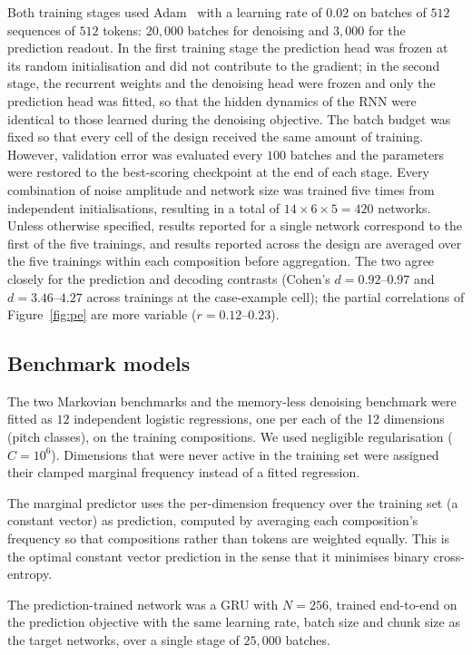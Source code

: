     Both training stages used Adam~\cite{kingma2015adam} with a learning rate of $0.02$ on batches of $512$ sequences of $512$ tokens: $20{,}000$ batches for denoising and $3{,}000$ for the prediction readout. In the first training stage the prediction head was frozen at its random initialisation and did not contribute to the gradient; in the second stage, the recurrent weights and the denoising head were frozen and only the prediction head was fitted, so that the hidden dynamics of the RNN were identical to those learned during the denoising objective. The batch budget was fixed so that every cell of the design received the same amount of training. However, validation error was evaluated every $100$ batches and the parameters were restored to the best-scoring checkpoint at the end of each stage. Every combination of noise amplitude and network size was trained five times from independent initialisations, resulting in a total of $14 \times 6 \times 5 = 420$ networks. Unless otherwise specified, results reported for a single network correspond to the first of the five trainings, and results reported across the design are averaged over the five trainings within each composition before aggregation. The two agree closely for the prediction and decoding contrasts (Cohen's $d = 0.92$--$0.97$ and $d = 3.46$--$4.27$ across trainings at the case-example cell); the partial correlations of Figure~\ref{fig:pe} are more variable ($r = 0.12$--$0.23$).

  \subsection*{Benchmark models}

    The two Markovian benchmarks and the memory-less denoising benchmark were fitted as $12$ independent logistic regressions, one per each of the 12 dimensions (pitch classes), on the training compositions. We used negligible regularisation ($C = 10^{6}$). Dimensions that were never active in the training set were assigned their clamped marginal frequency instead of a fitted regression.

    The marginal predictor uses the per-dimension frequency over the training set (a constant vector) as prediction, computed by averaging each composition's frequency so that compositions rather than tokens are weighted equally. This is the optimal constant vector prediction in the sense that it minimises binary cross-entropy.

    The prediction-trained network was a GRU with $N = 256$, trained end-to-end on the prediction objective with the same learning rate, batch size and chunk size as the target networks, over a single stage of $25{,}000$ batches.


